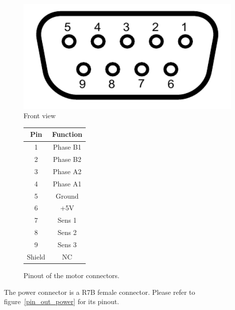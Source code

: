 \begin{figure}[h]
\begin{minipage}[b]{0.49\textwidth}
    \centering
    \includegraphics[width=1\textwidth]{grafiken/Numbered_DE9_female_Diagram.pdf}\\
    Front view
  \end{minipage}
  \hfill
  \begin{minipage}[b]{0.49\textwidth}
    \centering
    \begin{tabular}{cc}
      \toprule
      \textbf{Pin} & \textbf{Function} \\
      \toprule
      1 & Phase B1 \\ \midrule
      2 & Phase B2\\ \midrule
      3 & Phase A2 \\ \midrule
      4 & Phase A1 \\ \midrule
      5 & Ground \\ \midrule
      6 & +5V \\ \midrule
      7 & Sens 1 \\ \midrule
      8 & Sens 2 \\ \midrule
      9 & Sens 3 \\ \midrule
      Shield & NC \\
      \bottomrule
    \end{tabular}
  \end{minipage}
\caption[Pinout of the motor connectors.]{Pinout of the motor connectors.}
\label{pin_out}
\end{figure}

The power connector is a R7B female connector. Please refer to figure~\ref{pin_out_power} for its pinout.

